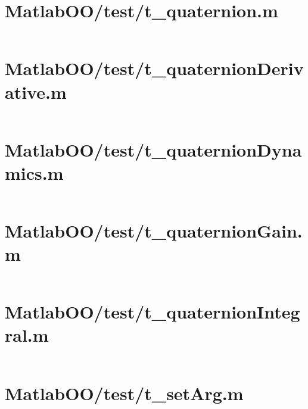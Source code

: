 \pagebreak
\section*{MatlabOO/test/t\_quaternion.m}\label{code:MatlabOO/test/t_quaternion.m}
\inputminted[linenos,fontsize=\scriptsize]{matlab}{/home/dcouture/git/mathyourlife/TSatPy/beta_versions/matlab_object_oriented/test/t_quaternion.m}

\pagebreak
\section*{MatlabOO/test/t\_quaternionDerivative.m}\label{code:MatlabOO/test/t_quaternionDerivative.m}
\inputminted[linenos,fontsize=\scriptsize]{matlab}{/home/dcouture/git/mathyourlife/TSatPy/beta_versions/matlab_object_oriented/test/t_quaternionDerivative.m}

\pagebreak
\section*{MatlabOO/test/t\_quaternionDynamics.m}\label{code:MatlabOO/test/t_quaternionDynamics.m}
\inputminted[linenos,fontsize=\scriptsize]{matlab}{/home/dcouture/git/mathyourlife/TSatPy/beta_versions/matlab_object_oriented/test/t_quaternionDynamics.m}

\pagebreak
\section*{MatlabOO/test/t\_quaternionGain.m}\label{code:MatlabOO/test/t_quaternionGain.m}
\inputminted[linenos,fontsize=\scriptsize]{matlab}{/home/dcouture/git/mathyourlife/TSatPy/beta_versions/matlab_object_oriented/test/t_quaternionGain.m}

\pagebreak
\section*{MatlabOO/test/t\_quaternionIntegral.m}\label{code:MatlabOO/test/t_quaternionIntegral.m}
\inputminted[linenos,fontsize=\scriptsize]{matlab}{/home/dcouture/git/mathyourlife/TSatPy/beta_versions/matlab_object_oriented/test/t_quaternionIntegral.m}

\pagebreak
\section*{MatlabOO/test/t\_setArg.m}\label{code:MatlabOO/test/t_setArg.m}
\inputminted[linenos,fontsize=\scriptsize]{matlab}{/home/dcouture/git/mathyourlife/TSatPy/beta_versions/matlab_object_oriented/test/t_setArg.m}

